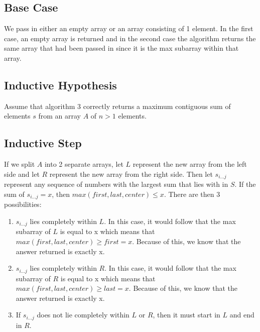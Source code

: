 \documentclass[11pt,letterpaper]{article}
\begin{document}
\subsection*{Base Case}
We pass in either an empty array or an array consisting of 1 element. In the first case, an empty array is returned and in the second case the algorithm returns the same array that had been passed in since it is the max subarray within that array.

\subsection*{Inductive Hypothesis}
Assume that algorithm 3 correctly returns a maximum contiguous sum of elements $s$ from an array $A$ of $n > 1$ elements. 

\subsection*{Inductive Step}
If we split $A$ into 2 separate arrays, let $L$ represent the new array from the left side and let $R$ represent the new array from the right side. Then let $s_{i...j}$ represent any sequence of numbers with the largest sum that lies with in $S$. If the sum of $s_{i...j} = x$, then $max(first, last, center) \leq x$. There are then 3 possibilities:
\begin{enumerate}
\item $s_{i...j}$ lies completely within $L$. In this case, it would follow that the max subarray of $L$ is equal to x which means that $max(first, last, center) \geq first = x$. Because of this, we know that the answer returned is exactly x.
\item $s_{i...j}$ lies completely within $R$. In this case, it would follow that the max subarray of $R$ is equal to x which means that $max(first, last, center) \geq last = x$. Because of this, we know that the answer returned is exactly x.
\item If $s_{i...j}$ does not lie completely within $L$ or $R$, then it must start in $L$ and end in $R$. 
\end{enumerate}
\end{document}
